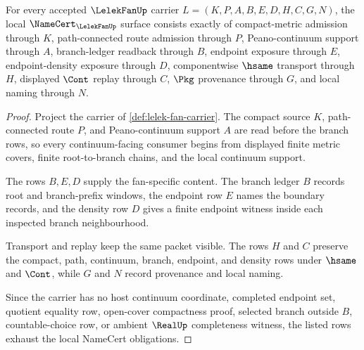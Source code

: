 \begin{theorem}
\label{thm:lelek-fan-namecert-obligations}
For every accepted $\LelekFanUp$ carrier $L=(K,P,A,B,E,D,H,C,G,N)$, the local $\NameCert_{\LelekFanUp}$ surface consists exactly of compact-metric admission through $K$, path-connected route admission through $P$, Peano-continuum support through $A$, branch-ledger readback through $B$, endpoint exposure through $E$, endpoint-density exposure through $D$, componentwise $\hsame$ transport through $H$, displayed $\Cont$ replay through $C$, $\Pkg$ provenance through $G$, and local naming through $N$.
\end{theorem}
\begin{proof}
Project the carrier of \autoref{def:lelek-fan-carrier}. The compact source $K$, path-connected route $P$, and Peano-continuum support $A$ are read before the branch rows, so every continuum-facing consumer begins from displayed finite metric covers, finite root-to-branch chains, and the local continuum support.

The rows $B,E,D$ supply the fan-specific content. The branch ledger $B$ records root and branch-prefix windows, the endpoint row $E$ names the boundary records, and the density row $D$ gives a finite endpoint witness inside each inspected branch neighbourhood.

Transport and replay keep the same packet visible. The rows $H$ and $C$ preserve the compact, path, continuum, branch, endpoint, and density rows under $\hsame$ and $\Cont$, while $G$ and $N$ record provenance and local naming.

Since the carrier has no host continuum coordinate, completed endpoint set, quotient equality row, open-cover compactness proof, selected branch outside $B$, countable-choice row, or ambient $\RealUp$ completeness witness, the listed rows exhaust the local NameCert obligations.
\end{proof}

